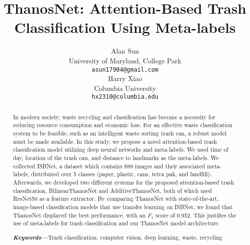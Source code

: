 \documentclass[conference]{ieeeconf}
\title{\LARGE \bf
ThanosNet: Attention-Based Trash Classification Using Meta-labels
}
\author{ \parbox{3 in}{\centering Alan Sun\\
        University of Maryland, College Park\\
        {\tt\small asun17904@gmail.com}}
        \hspace*{ 0.5 in}
        \parbox{3 in}{ \centering Harry Xiao\\
        Columbia University\\
        {\tt\small hx2310@columbia.edu}}
}
\begin{document}
\maketitle
\thispagestyle{empty}
\pagestyle{empty}


\begin{abstract}

In modern society, waste recycling and classification has become a necessity for reducing resource consumption and economic loss. For an effective waste classification system to be feasible, such as an intelligent waste sorting trash can, a robust model must be made available. In this study, we propose a novel attention-based trash classification model utilizing deep neural networks and meta-labels. We used time of day, location of the trash can, and distance to landmarks as the meta-labels. We collected ISBNet, a dataset which contains 889 images and their associated meta-labels, distributed over 5 classes (paper, plastic, cans, tetra pak, and landfill). Afterwards, we developed two different systems for the proposed attention-based trash classification, BilinearThanosNet and AdditiveThanosNet, both of which used ResNet50 as a feature extractor. By comparing ThanosNet with state-of-the-art, image-based classification models that use transfer learning on ISBNet, we found that ThanosNet displayed the best performance, with an $F_1$ score of 0.952. This justifies the use of meta-labels for trash classification and our ThanosNet model architecture. 

\vspace{4mm}

\textbf{\emph{Keywords---}}Trash classification, computer vision, deep learning, waste, recycling

\end{abstract}


\end{document}
